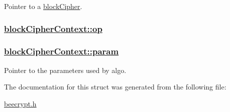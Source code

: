 Pointer to a \hyperlink{structblockCipher}{block\-Cipher}. 

\hypertarget{structblockCipherContext_o2}{
\subsubsection[op]{\setlength{\rightskip}{0pt plus 5cm}\hyperlink{structblockCipherContext_o2}{block\-Cipher\-Context::op}}}
\label{structblockCipherContext_o2}


\hypertarget{structblockCipherContext_o1}{
\subsubsection[param]{\setlength{\rightskip}{0pt plus 5cm}\hyperlink{structblockCipherContext_o1}{block\-Cipher\-Context::param}}}
\label{structblockCipherContext_o1}


Pointer to the parameters used by algo. 



The documentation for this struct was generated from the following file:\begin{CompactItemize}
\item 
\hyperlink{beecrypt_8h}{beecrypt.h}\end{CompactItemize}
